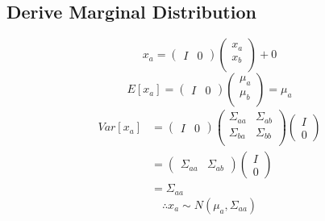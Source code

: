\documentclass{report}
\begin{document}
\subsection{Derive Marginal Distribution}
$$
x_a = \left (\begin{matrix}I & 0\end{matrix}\right )\left (\begin{matrix}x_a \\x_b\\\end{matrix}\right ) + 0
$$
$$
E[x_a] = \left (\begin{matrix}I & 0\end{matrix}\right )\left (\begin{matrix}\mu_a \\\mu_b \\\end{matrix}\right ) = \mu_a
$$
$$
\begin{aligned}Var[x_a] &= \left (\begin{matrix}I & 0\end{matrix}\right )\left (\begin{matrix}\Sigma_{aa} & \Sigma_{ab} \\\Sigma_{ba} & \Sigma_{bb} \\\end{matrix}\right )\left (\begin{matrix}I \\0\end{matrix}\right ) \\&= \left (\begin{matrix}\Sigma_{aa} & \Sigma_{ab} \end{matrix}\right )\left (\begin{matrix}I \\0\end{matrix}\right )\\&=\Sigma_{aa}\end{aligned}
$$
$$
\therefore x_a \sim N(\mu_a, \Sigma_{aa})
$$
\end{document}
